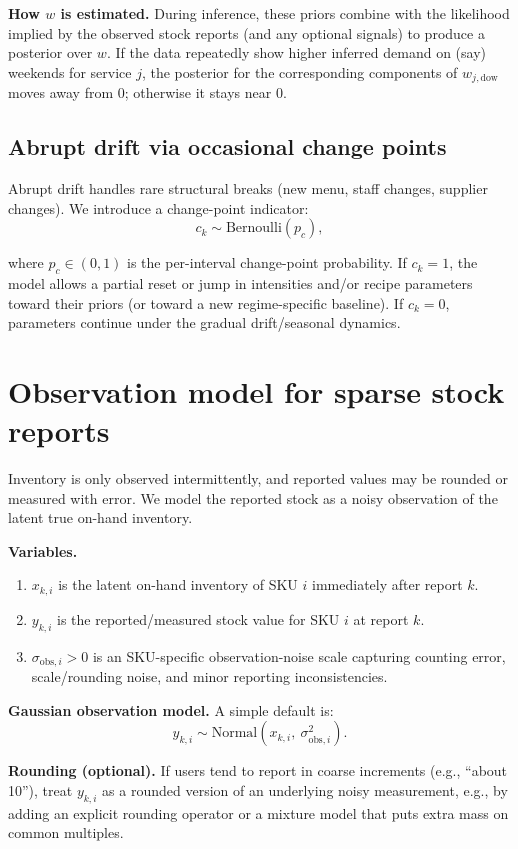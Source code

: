 \documentclass[11pt]{article}
\begin{document}
\textbf{How $w$ is estimated.} During inference, these priors combine with the likelihood implied by the observed stock reports (and any optional signals) to produce a posterior over $w$.
If the data repeatedly show higher inferred demand on (say) weekends for service $j$, the posterior for the corresponding components of $w_{j,\text{dow}}$ moves away from 0; otherwise it stays near 0.

\subsection{Abrupt drift via occasional change points}

Abrupt drift handles rare structural breaks (new menu, staff changes, supplier changes).
We introduce a change-point indicator:
\[
  c_k \sim \text{Bernoulli}(p_c),
\]

where $p_c\in(0,1)$ is the per-interval change-point probability.
If $c_k = 1$, the model allows a partial reset or jump in intensities and/or recipe parameters toward their priors (or toward a new regime-specific baseline).
If $c_k = 0$, parameters continue under the gradual drift/seasonal dynamics.

\section{Observation model for sparse stock reports}

Inventory is only observed intermittently, and reported values may be rounded or measured with error.
We model the reported stock as a noisy observation of the latent true on-hand inventory.

\textbf{Variables.}
\begin{enumerate}
  \item $x_{k,i}$ is the latent on-hand inventory of SKU $i$ immediately after report $k$.
  \item $y_{k,i}$ is the reported/measured stock value for SKU $i$ at report $k$.
  \item $\sigma_{\text{obs},i}>0$ is an SKU-specific observation-noise scale capturing counting error, scale/rounding noise, and minor reporting inconsistencies.
\end{enumerate}

\textbf{Gaussian observation model.} A simple default is:
\[
  y_{k,i} \sim \text{Normal}(x_{k,i},\ \sigma^2_{\text{obs},i}).
\]

\textbf{Rounding (optional).} If users tend to report in coarse increments (e.g., ``about 10''), treat $y_{k,i}$ as a rounded version of an underlying noisy measurement, e.g., by adding an explicit rounding operator or a mixture model that puts extra mass on common multiples.
\end{document}
